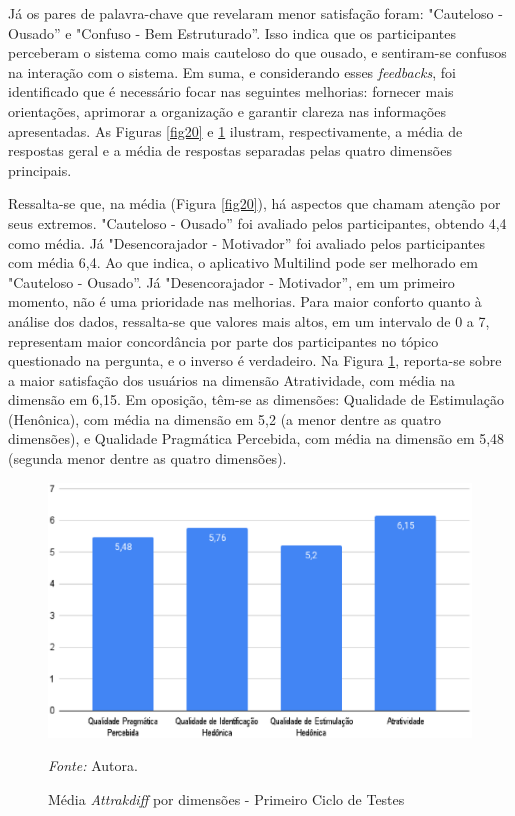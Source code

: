 Já os pares de palavra-chave que revelaram menor satisfação foram: "Cauteloso - Ousado'' e "Confuso - Bem Estruturado''. Isso indica que os participantes perceberam o sistema como mais cauteloso do que ousado, e 
sentiram-se confusos na interação com o sistema. Em suma, e considerando esses \textit{feedbacks}, foi identificado que é necessário focar nas seguintes melhorias: fornecer mais orientações, aprimorar a 
organização e garantir clareza nas informações apresentadas. As Figuras \ref{fig20} e \ref{fig21} ilustram, respectivamente, a média de respostas geral e a média de respostas separadas pelas quatro dimensões principais. 

Ressalta-se que, na média (Figura \ref{fig20}), há aspectos que chamam atenção por seus extremos. "Cauteloso - Ousado'' foi avaliado pelos participantes, obtendo 4,4 como média. Já "Desencorajador - Motivador'' foi avaliado pelos 
participantes com média 6,4. Ao que indica, o aplicativo Multilind pode ser melhorado em "Cauteloso - Ousado''. Já "Desencorajador - Motivador'', em um primeiro momento, não é uma prioridade nas melhorias. Para maior conforto 
quanto à análise dos dados, ressalta-se que valores mais altos, em um intervalo de 0 a 7, representam maior concordância por parte dos participantes no tópico questionado na pergunta, e o inverso é verdadeiro. Na Figura \ref{fig21}, 
reporta-se sobre a maior satisfação dos usuários na dimensão Atratividade, com média na dimensão em 6,15. Em oposição, têm-se as dimensões: Qualidade de Estimulação (Henônica), com média na dimensão em 5,2 (a menor dentre 
as quatro dimensões), e Qualidade Pragmática Percebida, com média na dimensão em 5,48 (segunda menor dentre as quatro dimensões).

\begin{figure}[h!]
	\centering
	\caption{Média \textit{Attrakdiff} por dimensões - Primeiro Ciclo de Testes}
	\begin{adjustbox}{center}
		\includegraphics[width=1\textwidth]{figuras/media-separada.eps}
	\end{adjustbox}
	\begin{tablenotes}[flushleft]
		\centering
		\item \textit{Fonte:} Autora.
	\end{tablenotes}
	\label{fig21}
\end{figure}

